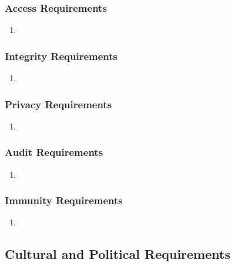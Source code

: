 \documentclass[]{article}
\begin{document}
\subsubsection{Access Requirements}
\label{ssub:access_requirements}
\begin{enumerate}[{SR-AC}1. ]
	\item 
\end{enumerate}

\subsubsection{Integrity Requirements}
\label{ssub:integrity_requirements}
\begin{enumerate}[{SR-INT}1. ]
	\item 
\end{enumerate}

\subsubsection{Privacy Requirements}
\label{ssub:privacy_requirements}
\begin{enumerate}[{SR-P}1. ]
	\item 
\end{enumerate}

\subsubsection{Audit Requirements}
\label{ssub:audit_requirements}
\begin{enumerate}[{SR-AU}1. ]
	\item 
\end{enumerate}

\subsubsection{Immunity Requirements}
\label{ssub:immunity_requirements}
\begin{enumerate}[{SR-IM}1. ]
	\item 
\end{enumerate}


\subsection{Cultural and Political Requirements}
\label{sub:cultural_and_political_requirements}
\end{document}
